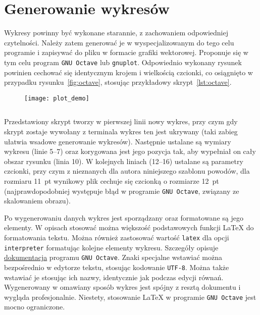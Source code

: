 \chapter{Generowanie wykresów}

Wykresy powinny być wykonane starannie, z zachowaniem odpowiedniej czytelności. Należy zatem generować je w wyspecjalizowanym do tego celu programie i zapisywać do pliku w formacie grafiki wektorowej. Proponuje się w tym celu program \texttt{GNU Octave} lub \texttt{gnuplot}. Odpowiednio wykonany rysunek powinien cechować się identycznym krojem i wielkością czcionki, co osiągnięto w przypadku rysunku~\ref{fig:octave}, stosując przykładowy skrypt~\ref{lst:octave}.

\begin{figure}[htb!]
\texttt{[image: plot\_demo]}
\end{figure}

\begin{listing}[hbt!]
\inputminted[linenos, breaklines]{octave}{skrypty/plot_demo.m}
\end{listing}

Przedstawiony skrypt tworzy w pierwszej linii nowy wykres, przy czym gdy skrypt zostaje wywołany z terminala wykres ten jest ukrywany (taki zabieg ułatwia wsadowe generowanie wykresów). Następnie ustalane są wymiary wykresu (linie 5--7) oraz korygowana jest jego pozycja tak, aby wypełniał on cały obszar rysunku (linia 10). W kolejnych liniach (12--16) ustalane są parametry czcionki, przy czym z nieznanych dla autora niniejszego szablonu powodów, dla rozmiaru \qty{11}{pt} wynikowy plik cechuje się czcionką o rozmiarze \qty{12}{pt} (najprawdopodobniej występuje błąd w programie \texttt{GNU Octave}, związany ze skalowaniem obrazu).

Po wygenerowaniu danych wykres jest sporządzany oraz formatowane są jego elementy. W opisach stosować można większość podstawowych funkcji \LaTeX{} do formatowania tekstu. Można również zastosować wartość \texttt{latex} dla opcji \texttt{interpreter} formatując kolejne elementy wykresu. Szczegóły opisuje \href{https://docs.octave.org/latest}{dokumentacja} programu \texttt{GNU Octave}. Znaki specjalne wstawiać można bezpośrednio w edytorze tekstu, stosując kodowanie \texttt{UTF-8}. Można także wstawiać je stosując ich nazwy, identycznie jak podczas edycji równań. Wygenerowany w omawiany sposób wykres jest spójny z resztą dokumentu i wygląda profesjonalnie. Niestety, stosowanie \LaTeX{} w programie \texttt{GNU Octave} jest mocno ograniczone.

